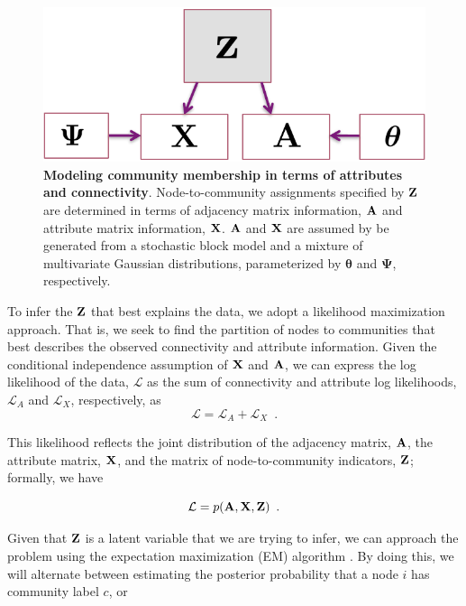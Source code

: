 \documentclass[journal]{IEEEtran}
\begin{document}
\begin{figure}
\begin{center}
\includegraphics[scale=0.5]{GraphModel.pdf}
\caption{{\bf Modeling community membership in terms of attributes and connectivity}. Node-to-community assignments specified by ${\bf Z}$ are determined in terms of adjacency matrix information, ${\bf A}$ and attribute matrix information, ${\bf X}$. ${\bf A}$ and ${\bf X}$ are assumed by be generated from a stochastic block model and a mixture of multivariate Gaussian distributions, parameterized by ${\boldsymbol \theta}$ and ${\boldsymbol \Psi}$, respectively.
\label{fig:graphical_model}} 
\end{center}
\end{figure}

To infer the ${\bf Z}$ that best explains the data, we adopt a likelihood maximization approach. That is, we seek to find the partition of nodes to communities that best describes the observed connectivity and attribute information.  Given the conditional independence assumption of ${\bf X}$ and ${\bf A}$, we can express the log likelihood of the data, ${\mathcal L}$ as the sum of connectivity and attribute log likelihoods, ${\mathcal L}_{A}$ and ${\mathcal L}_{X}$, respectively,
as
\begin{equation}
\mathcal{L}=\mathcal{L}_{A}+\mathcal{L}_{X}\enspace.
\label{eqn:likelihood_decomposition}
\end{equation}

This likelihood reflects the joint distribution of the adjacency matrix, ${\bf A}$, the attribute matrix, ${\bf X}$, and the matrix of node-to-community indicators, ${\bf Z}$; formally, we have 

\begin{equation}
\mathcal{L}=p({\bf A},{\bf X},{\bf Z})\enspace. 
\end{equation}

Given that ${\bf Z}$ is a latent variable that we are trying to infer, we can approach the problem using the expectation maximization (EM) algorithm \cite{EM}. By doing this, we will alternate between estimating the posterior probability that a node $i$ has community label $c$, or
\end{document}
